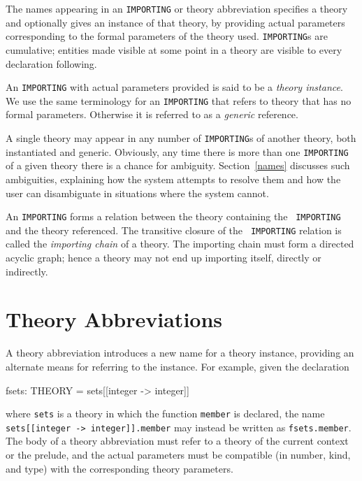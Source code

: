 The names appearing in an {\tt IMPORTING} or theory abbreviation specifies a
theory and optionally gives an instance of that theory, by providing
actual parameters corresponding to the formal parameters of the theory
used.  {\tt IMPORTING}s are cumulative; entities made visible at some point
in a theory are visible to every declaration following.

An {\tt IMPORTING} with actual parameters provided is said to be a {\em
theory instance\/}. We use the same terminology for
an {\tt IMPORTING} that refers to theory that has no formal parameters.
Otherwise it is referred to as a {\em generic\/}
reference.

A single theory may appear in any number of {\tt IMPORTING}s of another
theory, both instantiated and generic.  Obviously, any time there is
more than one {\tt IMPORTING} of a given theory there is a chance for
ambiguity.  Section~\ref{names} discusses such ambiguities, explaining
how the system attempts to resolve them and how the user can
disambiguate in situations where the system cannot.

An {\tt IMPORTING} forms a relation between the theory containing the {\tt
IMPORTING} and the theory referenced.  The transitive closure of the {\tt
IMPORTING} relation is called the {\em importing chain\/} of a theory.  The
importing chain must form a directed acyclic graph; hence a theory may not
end up importing itself, directly or indirectly.


\section{Theory Abbreviations}\label{theory-abbreviations}

A theory abbreviation introduces a new name for a theory instance,
providing an alternate means for referring to the instance.  For
example, given the declaration
\begin{pvsex}
  fsets: THEORY = sets[[integer -> integer]]
\end{pvsex}
where {\tt sets} is a theory in which the function {\tt member} is
declared, the name {\tt sets[[integer -> integer]].member} may instead
be written as {\tt fsets.member}.  The body of a theory abbreviation
must refer to a theory of the current context or the prelude, and the
actual parameters must be compatible (in number, kind, and type) with
the corresponding theory parameters.

